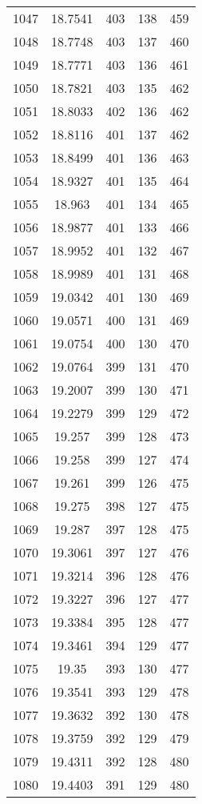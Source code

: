 \documentclass[12pt,a4paper]{article}
\begin{document}
\begin{tabular}{r|cccc}
	1047 & 18.7541 & 403 & 138 & 459 \\
	1048 & 18.7748 & 403 & 137 & 460 \\
	1049 & 18.7771 & 403 & 136 & 461 \\
	1050 & 18.7821 & 403 & 135 & 462 \\
	1051 & 18.8033 & 402 & 136 & 462 \\
	1052 & 18.8116 & 401 & 137 & 462 \\
	1053 & 18.8499 & 401 & 136 & 463 \\
	1054 & 18.9327 & 401 & 135 & 464 \\
	1055 & 18.963 & 401 & 134 & 465 \\
	1056 & 18.9877 & 401 & 133 & 466 \\
	1057 & 18.9952 & 401 & 132 & 467 \\
	1058 & 18.9989 & 401 & 131 & 468 \\
	1059 & 19.0342 & 401 & 130 & 469 \\
	1060 & 19.0571 & 400 & 131 & 469 \\
	1061 & 19.0754 & 400 & 130 & 470 \\
	1062 & 19.0764 & 399 & 131 & 470 \\
	1063 & 19.2007 & 399 & 130 & 471 \\
	1064 & 19.2279 & 399 & 129 & 472 \\
	1065 & 19.257 & 399 & 128 & 473 \\
	1066 & 19.258 & 399 & 127 & 474 \\
	1067 & 19.261 & 399 & 126 & 475 \\
	1068 & 19.275 & 398 & 127 & 475 \\
	1069 & 19.287 & 397 & 128 & 475 \\
	1070 & 19.3061 & 397 & 127 & 476 \\
	1071 & 19.3214 & 396 & 128 & 476 \\
	1072 & 19.3227 & 396 & 127 & 477 \\
	1073 & 19.3384 & 395 & 128 & 477 \\
	1074 & 19.3461 & 394 & 129 & 477 \\
	1075 & 19.35 & 393 & 130 & 477 \\
	1076 & 19.3541 & 393 & 129 & 478 \\
	1077 & 19.3632 & 392 & 130 & 478 \\
	1078 & 19.3759 & 392 & 129 & 479 \\
	1079 & 19.4311 & 392 & 128 & 480 \\
	1080 & 19.4403 & 391 & 129 & 480 \\

\end{tabular}
\end{document}
